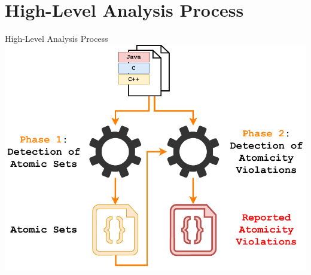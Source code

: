 \documentclass[10pt, xcolor=pdflatex, hyperref={unicode}, aspectratio=169]{beamer}
\begin{document}
\section{High-Level Analysis Process}
\begin{frame}{High-Level Analysis Process}
    \centering
    \includegraphics[width=.7 \linewidth]{analyser-proposal-sets.pdf}
\end{frame}


\end{document}
